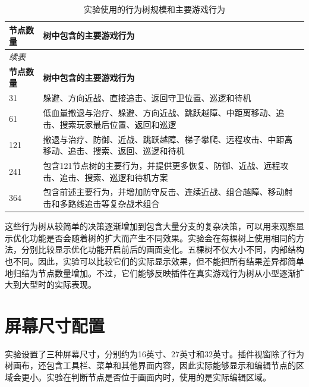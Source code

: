 \documentclass[11pt,a4paper,oneside,extrafontsizes]{memoir}
\begin{document}
\begin{center}
\small
\begin{longtable}{@{}p{} p{}@{}}
\caption{实验使用的行为树规模和主要游戏行为}\label{tab:auto-1}\\
\toprule
\textbf{节点数量} & \textbf{树中包含的主要游戏行为} \\
\midrule
\endfirsthead
\multicolumn{2}{l}{\small\itshape 续表}\\
\toprule
\textbf{节点数量} & \textbf{树中包含的主要游戏行为} \\
\midrule
\endhead
31 & 躲避、方向近战、直接追击、返回守卫位置、巡逻和待机 \\
61 & 低血量撤退与治疗、躲避、方向近战、跳跃越障、中距离移动、追击、搜索玩家最后位置、返回和巡逻 \\
121 & 撤退与治疗、防御、近战、跳跃越障、梯子攀爬、远程攻击、中距离移动、追击、搜索、返回、巡逻和待机 \\
241 & 包含121节点树的主要行为，并提供更多恢复、防御、近战、远程攻击、追击、搜索、巡逻和待机方案 \\
364 & 包含前述主要行为，并增加防守反击、连续近战、组合越障、移动射击和多路线追击等复杂战术组合 \\
\bottomrule
\end{longtable}
\end{center}

这些行为树从较简单的决策逐渐增加到包含大量分支的复杂决策，可以用来观察显示优化功能是否会随着树的扩大而产生不同效果。实验会在每棵树上使用相同的方法，分别比较显示优化功能开启前后的画面变化。五棵树不仅大小不同，内部结构也不同。因此，实验可以比较它们的实际显示效果，但不能把所有结果差异都简单地归结为节点数量增加。不过，它们能够反映插件在真实游戏行为树从小型逐渐扩大到大型时的实际表现。

\section{屏幕尺寸配置}

实验设置了三种屏幕尺寸，分别约为16英寸、27英寸和32英寸。插件视窗除了行为树画布，还包含工具栏、菜单和其他界面内容，因此实际能够显示和编辑节点的区域会更小。实验在判断节点是否位于画面内时，使用的是实际编辑区域。
\end{document}

